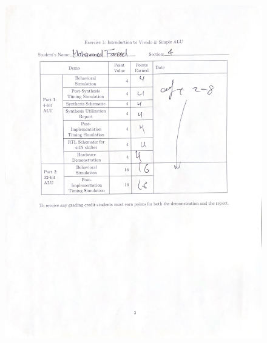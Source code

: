 \documentclass[CMPE]{../KGCOEReport}
\begin{document}
\newpage
\begin{figure}[H]
    \centering
    \begin{adjustbox}{center}
        \includegraphics[width=1.35\textwidth]{signoff.pdf}
    \end{adjustbox}
\end{figure}
\end{document}
